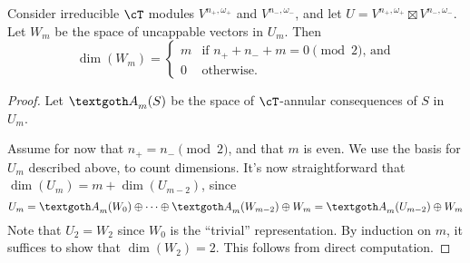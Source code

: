 \documentclass{article}
\begin{document}
\begin{lem}
Consider irreducible $\cT$ modules $V^{n_+, \omega_+}$ and $V^{n_-, \omega_-}$, and let $U=V^{n_+, \omega_+} \boxtimes V^{n_-, \omega_-}$.
Let $W_m$ be the space of uncappable vectors in $U_m$.
Then $$\dim(W_m)=\begin{cases} m & \text{if $n_+ + n_- + m = 0 \pmod 2$, and} \\ 0 & \text{otherwise.}\end{cases}$$
\end{lem}
\begin{proof}
Let $\gA_m(S)$ be the space of $\cT$-annular consequences of $S$ in $U_m$.

Assume for now that $n_+ = n_- \pmod 2$, and that $m$ is even. 
We use the basis for $U_m$ described above, to count dimensions.
It's now straightforward that $\dim(U_m)=m+\dim(U_{m-2})$, since
$$
U_{m}
=
\gA_m(W_0)\oplus\cdots\oplus \gA_m(W_{m-2})\oplus W_m 
= 
\gA_m(U_{m-2})\oplus W_m
$$
Note that $U_{2}=W_{2}$ since $W_{0}$ is the ``trivial'' representation. 
By induction on $m$, it suffices to show that $\dim(W_{2})=2$.  
This follows from direct computation.
\end{proof}
\end{document}
